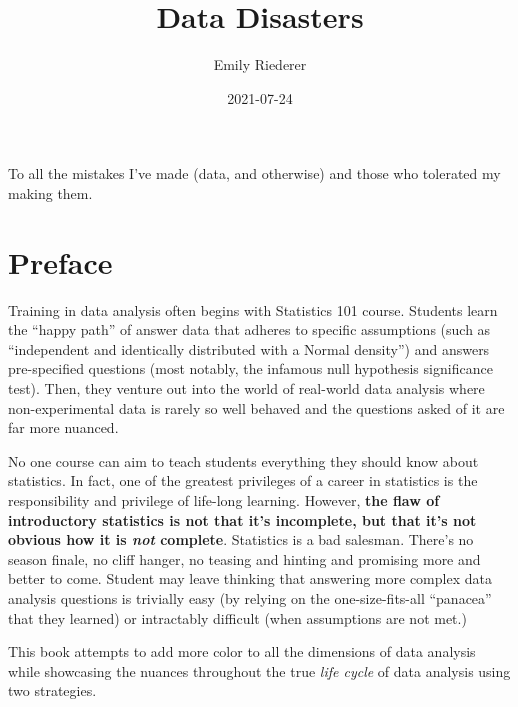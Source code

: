 \documentclass[
]{krantz}
\title{Data Disasters}
\author{Emily Riederer}
\date{2021-07-24}
\begin{document}
\maketitle


\thispagestyle{empty}

\begin{center}
To all the mistakes I've made (data, and otherwise) and those who tolerated my making them.
\end{center}

\setlength{\abovedisplayskip}{-5pt}
\setlength{\abovedisplayshortskip}{-5pt}

{
\hypersetup{linkcolor=}
\setcounter{tocdepth}{2}
\tableofcontents
}
\listoftables
\listoffigures
\hypertarget{preface}{%
\chapter*{Preface}\label{preface}}


Training in data analysis often begins with Statistics 101 course.
Students learn the ``happy path'' of answer data that adheres to specific assumptions (such as ``independent and identically distributed with a Normal density'') and answers pre-specified questions (most notably, the infamous null hypothesis significance test).
Then, they venture out into the world of real-world data analysis where non-experimental data is rarely so well behaved and the questions asked of it are far more nuanced.

No one course can aim to teach students everything they should know about statistics. In fact, one of the greatest privileges of a career in statistics is the responsibility and privilege of life-long learning.
However, \textbf{the flaw of introductory statistics is not that it's incomplete, but that it's not obvious how it is \emph{not} complete}.
Statistics is a bad salesman. There's no season finale, no cliff hanger, no teasing and hinting and promising more and better to come.
Student may leave thinking that answering more complex data analysis questions is trivially easy (by relying on the one-size-fits-all ``panacea'' that they learned) or intractably difficult (when assumptions are not met.)

This book attempts to add more color to all the dimensions of data analysis while showcasing the nuances throughout the true \emph{life cycle} of data analysis using two strategies.
\end{document}

